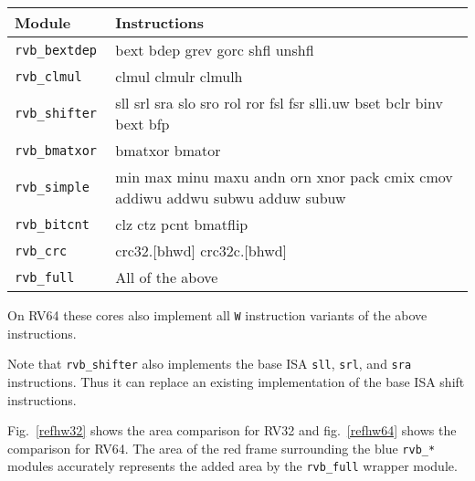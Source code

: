 \begin{center}
\begin{tabular}{lp{6cm}}
Module & Instructions \\
\hline
\tt rvb\_bextdep  & bext bdep grev gorc shfl unshfl                                               \\
\tt rvb\_clmul    & clmul clmulr clmulh                                                           \\
\tt rvb\_shifter  & sll srl sra slo sro rol ror fsl fsr slli.uw bset bclr binv bext bfp           \\
\tt rvb\_bmatxor  & bmatxor bmator                                                                \\
\tt rvb\_simple   & min max minu maxu andn orn xnor pack cmix cmov addiwu addwu subwu adduw subuw \\
\tt rvb\_bitcnt   & clz ctz pcnt bmatflip                                                         \\
\tt rvb\_crc      & crc32.[bhwd] crc32c.[bhwd]                                                    \\
\tt rvb\_full     & All of the above                                                              \\
\end{tabular}
\end{center}

On RV64 these cores also implement all {\tt *W} instruction variants of the above instructions.

Note that {\tt rvb\_shifter} also implements the base ISA {\tt sll}, {\tt srl},
and {\tt sra} instructions. Thus it can replace an existing implementation of
the base ISA shift instructions.

Fig.~\ref{refhw32} shows the area comparison for RV32 and fig.~\ref{refhw64} shows the comparison for RV64.
The area of the red frame surrounding the blue {\tt rvb\_*} modules accurately represents the added area
by the {\tt rvb\_full} wrapper module.


